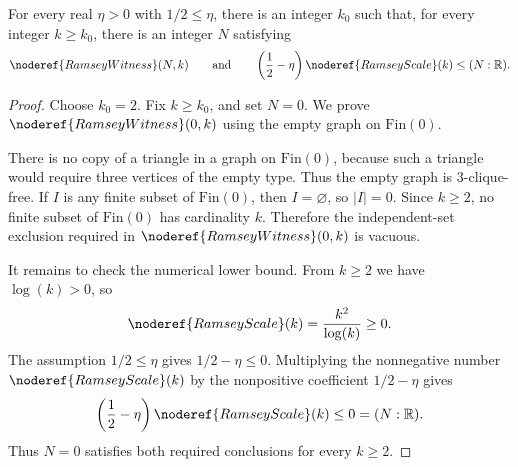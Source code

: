 \begin{lemma}
For every real \(\eta>0\) with \(1/2\le \eta\), there is an integer \(k_0\)
such that, for every integer \(k\ge k_0\), there is an integer \(N\) satisfying
\[
\noderef{RamseyWitness}(N,k)
\qquad\text{and}\qquad
\left(\frac12-\eta\right)\noderef{RamseyScale}(k)\le (N:\mathbb R).
\]
\end{lemma}
\begin{proof}
Choose \(k_0=2\).  Fix \(k\ge k_0\), and set \(N=0\).  We prove
\(\noderef{RamseyWitness}(0,k)\) using the empty graph on \(\mathrm{Fin}(0)\).

There is no copy of a triangle in a graph on \(\mathrm{Fin}(0)\), because such
a triangle would require three vertices of the empty type.  Thus the empty
graph is \(3\)-clique-free.  If \(I\) is any finite subset of \(\mathrm{Fin}(0)\),
then \(I=\varnothing\), so \(|I|=0\).  Since \(k\ge2\), no finite subset of
\(\mathrm{Fin}(0)\) has cardinality \(k\).  Therefore the independent-set
exclusion required in \(\noderef{RamseyWitness}(0,k)\) is vacuous.

It remains to check the numerical lower bound.  From \(k\ge2\) we have
\(\log(k)>0\), so
\[
\noderef{RamseyScale}(k)=\frac{k^2}{\log(k)}\ge0.
\]
The assumption \(1/2\le\eta\) gives \(1/2-\eta\le0\).  Multiplying the
nonnegative number \(\noderef{RamseyScale}(k)\) by the nonpositive coefficient
\(1/2-\eta\) gives
\[
\left(\frac12-\eta\right)\noderef{RamseyScale}(k)\le0=(N:\mathbb R).
\]
Thus \(N=0\) satisfies both required conclusions for every \(k\ge2\).
\end{proof}
